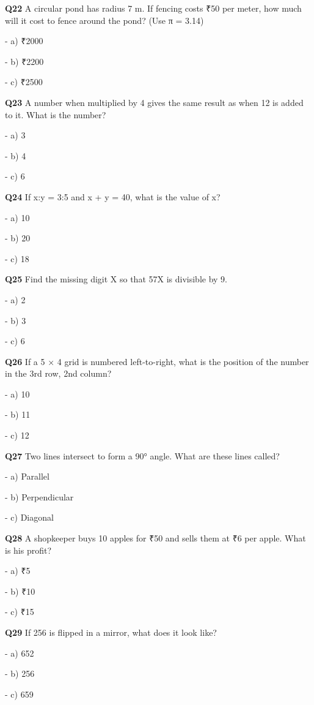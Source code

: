 \textbf{Q22} A circular pond has radius 7 m. If fencing costs ₹50 per meter, how much will it cost to fence around the pond? (Use π = 3.14)\par
\quad - a) ₹2000\par
\quad - b) ₹2200\par
\quad - c) ₹2500\par

\textbf{Q23} A number when multiplied by 4 gives the same result as when 12 is added to it. What is the number?\par
\quad - a) 3\par
\quad - b) 4\par
\quad - c) 6\par

\textbf{Q24} If x:y = 3:5 and x + y = 40, what is the value of x?\par
\quad - a) 10\par
\quad - b) 20\par
\quad - c) 18\par

\textbf{Q25} Find the missing digit X so that 57X is divisible by 9.\par
\quad - a) 2\par
\quad - b) 3\par
\quad - c) 6\par

\textbf{Q26} If a 5 × 4 grid is numbered left-to-right, what is the position of the number in the 3rd row, 2nd column?\par
\quad - a) 10\par
\quad - b) 11\par
\quad - c) 12\par

\textbf{Q27} Two lines intersect to form a 90° angle. What are these lines called?\par
\quad - a) Parallel\par
\quad - b) Perpendicular\par
\quad - c) Diagonal\par

\textbf{Q28} A shopkeeper buys 10 apples for ₹50 and sells them at ₹6 per apple. What is his profit?\par
\quad - a) ₹5\par
\quad - b) ₹10\par
\quad - c) ₹15\par

\textbf{Q29} If 256 is flipped in a mirror, what does it look like?\par
\quad - a) 652\par
\quad - b) 256\par
\quad - c) 659\par

